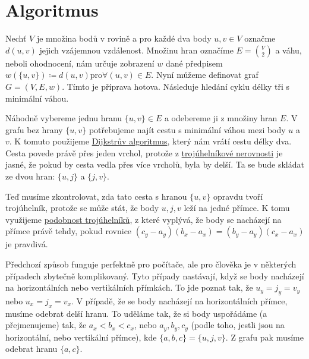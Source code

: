 \section{Algoritmus}
\label{sec:algoritmus}

Nechť $V$ je množina bodů v rovině a pro každé dva body $u, v \in V$ označme $d(u, v)$ jejich vzájemnou vzdálenost. Množinu hran označíme $E = \binom{V}{2}$ a váhu, neboli ohodnocení, nám určuje zobrazení $w$ dané předpisem $w(\{u, v\}) \coloneqq d(u, v) $pro$ \forall (u, v) \in E$. Nyní můžeme definovat graf $G = (V, E, w)$.
Tímto je příprava hotova. Následuje hledání cyklu délky tři s minimální váhou.



Náhodně vybereme jednu hranu $\{u, v\} \in E$ a odebereme ji z množiny hran $E$. V grafu bez hrany $\{u, v\}$ potřebujeme najít cestu s minimální váhou mezi body $u$ a  $v$. K tomuto použijeme \hyperref[sec:dijkstra]{Dijkstrův algoritmus}, který nám vrátí cestu délky dva. Cesta povede právě přes jeden vrchol, protože z \hyperref[definice:trojuhelnikova_nerovnost]{trojúhelníkové nerovnosti} je jasné, že pokud by cesta vedla přes více vrcholů, byla by delší. Ta se bude skládat ze dvou hran: $\{u, j\}$ a $\{j, v\}$.

Teď musíme zkontrolovat, zda tato cesta s hranou $\{u, v\}$ opravdu tvoří trojúhelník, protože se může  stát, že body $u, j, v$ leží na jedné přímce. K tomu využijeme \hyperref[sec:podobnost]{podobnost trojúhelníků}, z které vyplývá, že body se nacházejí na přímce právě tehdy, pokud rovnice $(c_y - a_y)(b_x - a_x) = (b_y - a_y)(c_x - a_x)$ je pravdivá. 

\begin{poznamka}
Předchozí způsob funguje perfektně pro počítače, ale pro člověka je v některých případech zbytečně komplikovaný. Tyto případy nastávají, když se body nacházejí na horizontálních nebo vertikálních přímkách. To jde poznat tak, že $u_y = j_y = v_y$ nebo $u_x = j_x = v_x$.
V případě, že se body nacházejí na horizontálních přímce, musíme odebrat delší hranu. To uděláme tak, že si body uspořádáme (a přejmenujeme) tak, že $a_x<b_x<c_x$, nebo $a_y, b_y, c_y$ (podle toho, jestli jsou na horizontální, nebo vertikální přímce), kde $\{a, b, c\} = \{u, j, v\}$. Z grafu pak musíme odebrat hranu $\{a, c\}$.
\end{poznamka}


